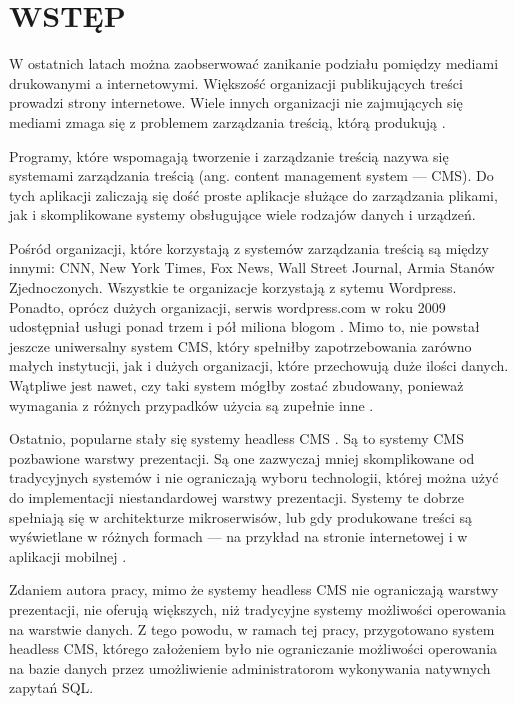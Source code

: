 \section{WSTĘP}

W ostatnich latach można zaobserwować zanikanie podziału pomiędzy mediami
drukowanymi a internetowymi. Większość organizacji publikujących treści prowadzi
strony internetowe. Wiele innych organizacji nie zajmujących się mediami zmaga
się z problemem zarządzania treścią, którą produkują \cite{Mauthe_2004}. 

Programy, które wspomagają tworzenie i zarządzanie treścią nazywa się systemami
zarządzania treścią (ang. content management system — CMS). Do tych aplikacji
zaliczają się dość proste aplikacje służące do zarządzania plikami, jak i
skomplikowane systemy obsługujące wiele rodzajów danych i urządzeń.

Pośród organizacji, które korzystają z systemów zarządzania treścią są między
innymi: CNN, New York Times, Fox News, Wall Street Journal, Armia Stanów
Zjednoczonych. Wszystkie te organizacje korzystają z sytemu Wordpress. Ponadto,
oprócz dużych organizacji, serwis wordpress.com w roku 2009 udostępniał usługi
ponad trzem i pół miliona blogom \cite{brazell2010wordpress}. Mimo to, nie
powstał jeszcze uniwersalny system CMS, który spełniłby zapotrzebowania zarówno
małych instytucji, jak i dużych organizacji, które przechowują duże ilości
danych. Wątpliwe jest nawet, czy taki system mógłby zostać zbudowany, ponieważ
wymagania z różnych przypadków użycia są zupełnie inne \cite{Mauthe_2004}.

Ostatnio, popularne stały się systemy headless CMS \cite{WhyHeadlessCMS}. Są to
systemy CMS pozbawione warstwy prezentacji. Są one zazwyczaj mniej skomplikowane
od tradycyjnych systemów i nie ograniczają wyboru technologii, której można użyć
do implementacji niestandardowej warstwy prezentacji. Systemy te dobrze
spełniają się w architekturze mikroserwisów, lub gdy produkowane treści są
wyświetlane w różnych formach — na przykład na stronie internetowej i w
aplikacji mobilnej \cite{WhyHeadlessCMS}.

\medspace

Zdaniem autora pracy, mimo że systemy headless CMS nie ograniczają warstwy
prezentacji, nie oferują większych, niż tradycyjne systemy możliwości operowania
na warstwie danych. Z tego powodu, w ramach tej pracy, przygotowano system
headless CMS, którego założeniem było nie ograniczanie możliwości operowania na
bazie danych przez umożliwienie administratorom wykonywania natywnych zapytań
SQL.

